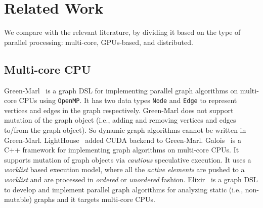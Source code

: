 \section{Related Work}\label{sec:related}
We compare with the relevant literature, by dividing it based on the type of parallel processing: multi-core, GPUs-based, and distributed.

\subsection{Multi-core CPU}
Green-Marl~\cite{Hong:2012:GDE:2150976.2151013} is a graph DSL for 
implementing parallel graph algorithms on multi-core CPUs using \texttt{OpenMP}.
It has two data types {\tt Node} and {\tt Edge} to represent vertices and edges in the graph respectively.
 Green-Marl does not support mutation of the graph object
(i.e., adding and removing vertices and edges to/from the graph object). So dynamic graph algorithms cannot be written in Green-Marl.
LightHouse~\cite{lighthouse} added CUDA backend to Green-Marl.
Galois~\cite{Pingali:2011:TPA:1993316.1993501} is a C++ framework for implementing graph algorithms on multi-core CPUs. It supports mutation of graph objects via {\it cautious} speculative execution. 
It uses a {\it worklist} based execution model, where all the {\it active elements} are pushed to a {\it worklist} and are processed in {\it ordered} or {\it unordered} fashion.
Elixir~\cite{Prountzos:2012:ESS:2398857.2384644} is  a graph DSL to  develop and implement parallel graph algorithms for analyzing static (i.e., non-mutable) graphs and it targets multi-core CPUs.


